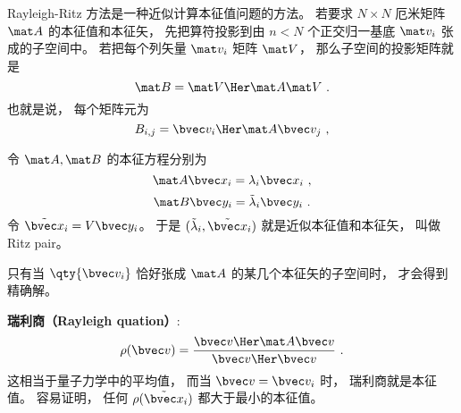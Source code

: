 
\begin{issues}
\issueDraft
\end{issues}


Rayleigh-Ritz 方法是一种近似计算本征值问题的方法。 若要求 $N\times N$ 厄米矩阵 $\mat A$ 的本征值和本征矢， 先把算符投影到由 $n < N$ 个正交归一基底 $\mat v_i$ 张成的子空间中。 若把每个列矢量 $\mat v_i$ 矩阵 $\mat V$， 那么子空间的投影矩阵就是
\begin{equation}
\mat B = \mat V\Her \mat A \mat V~.
\end{equation}
也就是说， 每个矩阵元为
\begin{equation}
B_{i,j} = \bvec v_i\Her \mat A \bvec v_j~,
\end{equation}

令 $\mat A, \mat B$ 的本征方程分别为
\begin{equation}
\mat A \bvec x_i = \lambda_i \bvec x_i~,
\end{equation}
\begin{equation}
\mat B \bvec y_i = \tilde\lambda_i \bvec y_i~.
\end{equation}
令 $\tilde{\bvec x}_i = V \bvec y_i$。 于是 $(\tilde\lambda_i, \tilde{\bvec x}_i)$ 就是近似本征值和本征矢， 叫做 Ritz pair。

只有当 $\qty{\bvec v_i}$ 恰好张成 $\mat A$ 的某几个本征矢的子空间时， 才会得到精确解。

\textbf{瑞利商（Rayleigh quation）}:
\begin{equation}
\rho(\bvec v) = \frac{\bvec v\Her \mat A \bvec v}{\bvec v\Her \bvec v}~.
\end{equation}
这相当于量子力学中的平均值， 而当 $\bvec v = \bvec v_i$ 时， 瑞利商就是本征值。 容易证明， 任何 $\rho(\tilde {\bvec x}_i)$ 都大于最小的本征值。
